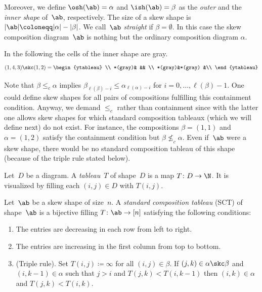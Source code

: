 Moreover, we define $\osh(\ab)= \alpha$ and $\ish(\ab)= \beta$ as the \emph{outer} and the \emph{inner shape} of~$\ab$, respectively. 
The size of a skew shape is $|\ab| \coloneqq |\alpha| - |\beta|$.
We call~$\ab$ \emph{straight} if $\beta = \emptyset$.
In this case the skew composition diagram~$\ab$ is nothing but the ordinary composition diagram $\alpha$.

\begin{exam} In the following the cells of the inner shape are gray.
	\[
		(1,4,3) \skc (1,2) =
		\begin{ytableau} 
			 \\
			*(gray)&		&& \\
			*(gray)&*(gray)	&\\
		\end{ytableau}
	\]	
\end{exam}

Note that $\beta \leq_c \alpha$ implies $\beta_{\ell(\beta)-i} \leq \alpha_{\ell(\alpha) - i}$ for $i=0,\dots, \ell(\beta) - 1$. One could define skew shapes for all pairs of compositions fulfilling this containment condition.
Anyway, we demand $\leq_c$ rather than containment since with the latter one allows skew shapes for which standard composition tableaux (which we will define next) do not exist.
For instance, the compositions $\beta = (1,1)$ and $\alpha = (1,2)$ satisfy the containment condition but $\beta \not \leq_c \alpha$.
Even if~$\ab$ were a skew shape, there would be no standard composition tableau of this shape (because of the triple rule stated below).

Let~$D$ be a diagram. A \emph{tableau}~$T$ of shape~$D$ is a map $T\colon D \to \N$. It is visualized by filling each $(i,j)\in D$ with $T(i,j)$.

\begin{defi}
	Let~$\ab$ be a skew shape of size~$n$. A \emph{standard composition tableau} (SCT) of shape~$\ab$ is a bijective filling $T\colon \ab \to [n]$ satisfying the following conditions:
	\begin{enumerate}
		\item
		The entries are decreasing in each row from left to right.
		\item
		The entries are increasing in the first column from top to bottom.		
		\item
		(Triple rule). Set $T(i,j)\coloneqq \infty$ for all $(i,j)\in \beta$.
		If $(j,k)\in \alpha \skc \beta$ and $(i,k-1)\in \alpha$ such that $j > i$ and $T(j,k) < T(i,k-1)$ then $(i,k) \in \alpha$ and $T(j,k) < T(i,k)$.

	\end{enumerate}
\end{defi}

